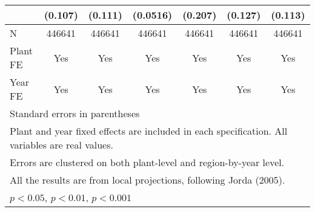 \begin{table}[htbp]
\begin{tabular}{l*{6}{c}}
                &  (0.107)         &  (0.111)         & (0.0516)         &  (0.207)         &  (0.127)         &  (0.113)         \\
\midrule
N               &   446641         &   446641         &   446641         &   446641         &   446641         &   446641         \\
Plant FE        &      Yes         &      Yes         &      Yes         &      Yes         &      Yes         &      Yes         \\
Year FE         &      Yes         &      Yes         &      Yes         &      Yes         &      Yes         &      Yes         \\
\bottomrule
\multicolumn{7}{l}{\footnotesize Standard errors in parentheses}\\
\multicolumn{7}{l}{\footnotesize Plant and year fixed effects are included in each specification. All variables are real values.}\\
\multicolumn{7}{l}{\footnotesize Errors are clustered on both plant-level and region-by-year level.}\\
\multicolumn{7}{l}{\footnotesize All the results are from local projections, following Jorda (2005).}\\
\multicolumn{7}{l}{\footnotesize \sym{*} \(p<0.05\), \sym{**} \(p<0.01\), \sym{***} \(p<0.001\)}\\
\end{tabular}
\end{table}
